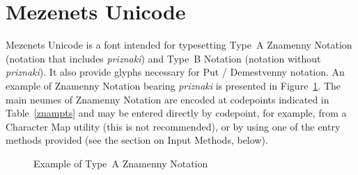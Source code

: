 \documentclass[11pt]{article}
\begin{document}
\section{Mezenets Unicode}

Mezenets Unicode is a font intended for typesetting Type~A Znamenny Notation (notation
that includes \emph{priznaki}) and Type~B Notation (notation without
\emph{priznaki}). It also provide glyphs necessary for Put / Demestvenny notation. An example of
Znamenny Notation bearing \emph{priznaki} is presented in Figure~\ref{mezenets}. 
The main neumes of Znamenny Notation are encoded at codepoints indicated in Table~\ref{znampts}
and may be entered directly by codepoint, for example, from a Character Map
utility (this is not recommended), or by using one of the entry methods provided
(see the section on Input Methods, below).

\begin{figure}[tbp]
\centering
\begin{minipage}{0.75\textwidth}
\begin{churchslavonic}
\noindent
{}
\end{churchslavonic}
\end{minipage}
\caption{Example of Type~A Znamenny Notation \label{mezenets}}
\end{figure}
\end{document}
